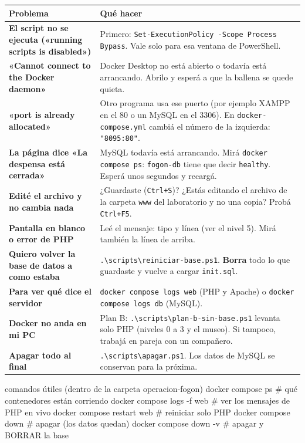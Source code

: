 \renewcommand{\arraystretch}{1.4}
\begin{longtable}{>{\raggedright\arraybackslash\bfseries}p{4.6cm} >{\raggedright\arraybackslash}p{11.2cm}}
\toprule
Problema & Qué hacer \\
\midrule
\endhead
El script no se ejecuta («running scripts is disabled») & Primero: \texttt{Set-ExecutionPolicy -Scope Process Bypass}. Vale solo para esa ventana de PowerShell. \\
«Cannot connect to the Docker daemon» & Docker Desktop no está abierto o todavía está arrancando. Abrilo y esperá a que la ballena se quede quieta. \\
«port is already allocated» & Otro programa usa ese puerto (por ejemplo XAMPP en el 80 o un MySQL en el 3306). En \texttt{docker-compose.yml} cambiá el número de la izquierda: \texttt{"8095:80"}. \\
La página dice «La despensa está cerrada» & MySQL todavía está arrancando. Mirá \texttt{docker compose ps}: \texttt{fogon-db} tiene que decir \texttt{healthy}. Esperá unos segundos y recargá. \\
Edité el archivo y no cambia nada & ¿Guardaste (\texttt{Ctrl+S})? ¿Estás editando el archivo de la carpeta \texttt{www} del laboratorio y no una copia? Probá \texttt{Ctrl+F5}. \\
Pantalla en blanco o error de PHP & Leé el mensaje: tipo y línea (ver el nivel 5). Mirá también la línea de arriba. \\
Quiero volver la base de datos a como estaba & \texttt{.\textbackslash scripts\textbackslash reiniciar-base.ps1}. \textbf{Borra} todo lo que guardaste y vuelve a cargar \texttt{init.sql}. \\
Para ver qué dice el servidor & \texttt{docker compose logs web} (PHP y Apache) o \texttt{docker compose logs db} (MySQL). \\
Docker no anda en mi PC & Plan B: \texttt{.\textbackslash scripts\textbackslash plan-b-sin-base.ps1} levanta solo PHP (niveles 0 a 3 y el museo). Si tampoco, trabajá en pareja con un compañero. \\
Apagar todo al final & \texttt{.\textbackslash scripts\textbackslash apagar.ps1}. Los datos de MySQL se conservan para la próxima. \\
\bottomrule
\end{longtable}

\begin{terminal}[PowerShell]{comandos útiles (dentro de la carpeta operacion-fogon)}
docker compose ps              # qué contenedores están corriendo
docker compose logs -f web     # ver los mensajes de PHP en vivo
docker compose restart web     # reiniciar solo PHP
docker compose down            # apagar (los datos quedan)
docker compose down -v         # apagar y BORRAR la base
\end{terminal}

